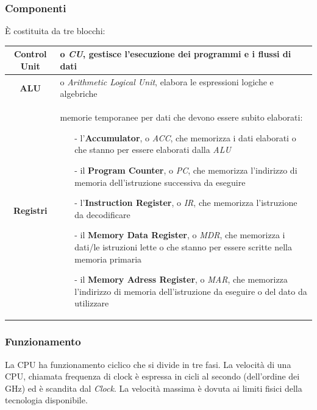 \documentclass{article}
\begin{document}
\subsubsection*{Componenti}
È costituita da tre blocchi:
\begin{center}	
	\begin{tabularx}{\textwidth}{c X}
		\textbf{Control Unit} & o \textit{CU}, gestisce l'esecuzione dei programmi e i flussi di dati \\
		\midrule
		\textbf{ALU} & o \textit{Arithmetic Logical Unit}, elabora le espressioni logiche e algebriche \\
		\midrule
		\textbf{Registri} & memorie temporanee per dati che devono essere subito elaborati:
		\begin{itemize}[topsep=3pt, itemsep=0pt]
			\item[-] l'\textbf{Accumulator}, o \textit{ACC}, che memorizza i dati elaborati o che stanno per essere elaborati dalla \textit{ALU}
			\item[-] il \textbf{Program Counter}, o \textit{PC}, che memorizza l'indirizzo di memoria dell'istruzione successiva da eseguire
			\item[-] l'\textbf{Instruction Register}, o \textit{IR}, che memorizza l'istruzione da decodificare
			\item[-] il \textbf{Memory Data Register},	o \textit{MDR}, che memorizza i dati/le istruzioni lette o che stanno per essere scritte nella memoria primaria
			\item[-] il \textbf{Memory Adress Register}, o \textit{MAR}, che memorizza l'indirizzo di memoria dell'istruzione da eseguire o del dato da utilizzare
		\end{itemize}
	\end{tabularx}
\end{center}

\subsubsection*{Funzionamento}
La CPU ha funzionamento ciclico che si divide in tre fasi. La velocità di una CPU, chiamata frequenza di clock è espressa
in cicli al secondo (dell'ordine dei GHz) ed è scandita dal \textit{Clock}. La velocità massima è dovuta ai limiti fisici
della tecnologia disponibile.
\end{document}
